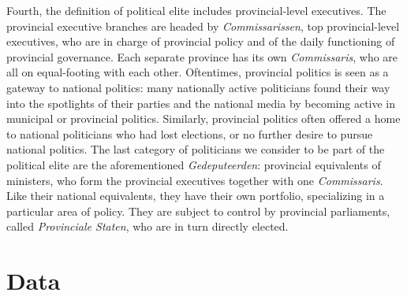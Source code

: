     Fourth, the definition of political elite includes provincial-level executives. The provincial executive branches are headed by \textit{Commissarissen}, top provincial-level executives, who are in charge of provincial policy and of the daily functioning of provincial governance. Each separate province has its own \textit{Commissaris}, who are all on equal-footing with each other. Oftentimes, provincial politics is seen as a gateway to national politics: many nationally active politicians found their way into the spotlights of their parties and the national media by becoming active in municipal or provincial politics. Similarly, provincial politics often offered a home to national politicians who had lost elections, or no further desire to pursue national politics. The last category of politicians we consider to be part of the political elite are the aforementioned \textit{Gedeputeerden}: provincial equivalents of ministers, who form the provincial executives together with one \textit{Commissaris}. Like their national equivalents, they have their own portfolio, specializing in a particular area of policy. They are subject to control by provincial parliaments, called \textit{Provinciale Staten}, who are in turn directly elected. \autocite{blok1987stemmen}

\section{Data}
